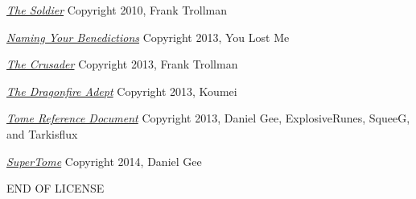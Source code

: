 \begin{small}
\begin{enumerate}
\href{http://tgdmb.com/viewtopic.php?t=50949}{\textit{The Soldier}} Copyright 2010, Frank Trollman

\href{http://www.tgdmb.com/viewtopic.php?p=304245#304245}{\textit{Naming Your Benedictions}} Copyright 2013, You Lost Me

\href{http://www.tgdmb.com/viewtopic.php?t=54090}{\textit{The Crusader}} Copyright 2013, Frank Trollman

\href{http://www.tgdmb.com/viewtopic.php?p=318737}{\textit{The Dragonfire Adept}} Copyright 2013, Koumei

\href{https://github.com/SqueeG/awesomeTome}{\textit{Tome Reference Document}} Copyright 2013, Daniel Gee, ExplosiveRunes, SqueeG, and Tarkisflux

\href{https://github.com/Lokathor/SuperTome}{\textit{SuperTome}} Copyright 2014, Daniel Gee
\end{enumerate}

END OF LICENSE

\end{small}